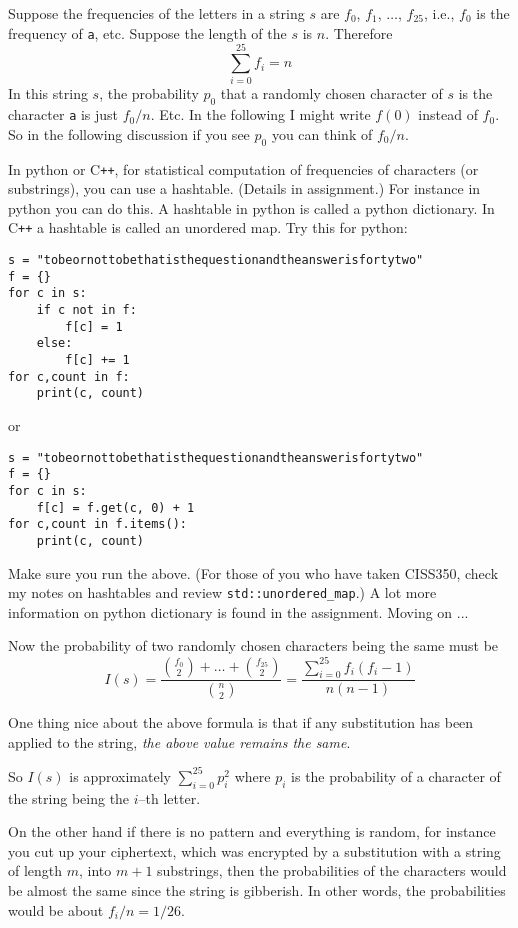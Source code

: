 Suppose the frequencies of the letters in a string $s$ are
$f_0$,
$f_1$, $\ldots$, $f_{25}$,
i.e., $f_0$ is the frequency of
\texttt{a}, etc.
Suppose the length of the $s$ is $n$.
Therefore
\[
\sum_{i=0}^{25} f_i = n
\]
In this string $s$, the probability $p_0$ that a randomly chosen
character of $s$ is the character \texttt{a} is just $f_0/n$.
Etc.
In the following I might write $f(0)$ instead of $f_0$.
So in the following discussion if you see $p_0$ you can think of $f_0/n$.

In python or C\texttt{++}, for statistical computation
of frequencies of characters (or substrings), you can use a hashtable.
(Details in assignment.)
For instance in python you can do this.
A hashtable in python is called a python dictionary.
In C\texttt{++} a hashtable is called an unordered map.
Try this for python:
\begin{Verbatim}[frame=single,fontsize=\small]
s = "tobeornottobethatisthequestionandtheanswerisfortytwo"
f = {}
for c in s:
    if c not in f:
        f[c] = 1
    else:
        f[c] += 1    
for c,count in f:
    print(c, count)    
\end{Verbatim}
or
\begin{Verbatim}[frame=single,fontsize=\small]
s = "tobeornottobethatisthequestionandtheanswerisfortytwo"
f = {}
for c in s:
    f[c] = f.get(c, 0) + 1
for c,count in f.items():
    print(c, count)    
\end{Verbatim}
Make sure you run the above.
(For those of you who have taken CISS350, 
check my notes on hashtables and review \verb!std::unordered_map!.)
A lot more information on python dictionary is found in the assignment.
Moving on ...

Now the
probability of two randomly chosen characters being the same must
be 
\[
  I(s) = \frac{\binom{f_0}{2} + \ldots + \binom{f_{25}}{2}}{\binom{n}{2}} =
  \frac{\sum_{i=0}^{25}f_i(f_i-1)}{n(n-1)}
\]

One thing nice about the above formula is that if any substitution
has been applied to the string,
\textit{the above value remains the same}.



So $I(s)$ is approximately $\sum_{i=0}^{25} p_i^2$ where $p_i$ is
the probability of a character of the string being the $i$--th
letter.

On the other hand if there is no pattern and everything is random,
for instance you cut up your ciphertext, which was encrypted by a
substitution with a string of length $m$, into $m+1$ substrings,
then the probabilities of the characters would be almost the same
since the string is gibberish. In other words, the probabilities
would be about $f_i/n = 1/26$.


